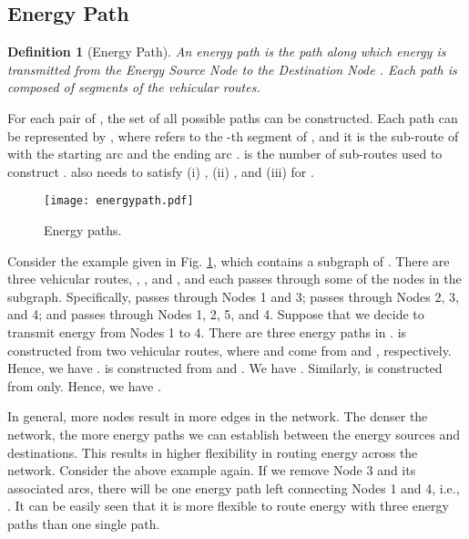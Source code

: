 \documentclass[journal]{IEEEtran}
\newtheorem{definition}{Definition}
\begin{document}
\subsection{Energy Path}
\begin{definition}[Energy Path]
An energy path  is the path along which energy is transmitted from the Energy Source Node  to  the Destination Node . Each path is composed of segments of the vehicular routes.
\end{definition}
For each pair of , the set of all possible paths  can be constructed. Each path  can be represented by , where  refers to the -th segment of , and it is the sub-route of  with the starting arc  and the ending arc .  is the number of sub-routes used to construct .  also needs to satisfy
(i) ,
(ii) , and
(iii)  for .
\begin{figure}[!t]
\centering
\texttt{[image: energypath.pdf]}\vspace{-0.5cm}
\caption{Energy paths.}
\label{fig:energypaths}
\vspace{-0.3cm}
\end{figure}
Consider the example given in Fig. \ref{fig:energypaths}, which contains a subgraph of .  There are three vehicular routes, , , and , and each passes through some of the nodes in the subgraph. Specifically,  passes through Nodes 1 and 3;  passes through Nodes 2, 3, and 4; and  passes through Nodes 1, 2, 5, and 4. Suppose that we decide to transmit energy from Nodes 1 to 4. There are three energy paths in .  is constructed from two vehicular routes, where  and  come from  and , respectively. Hence, we have .
 is constructed from  and . We have .
Similarly,  is constructed from  only. Hence, we have .

In general, more nodes result in more edges in the network. The denser the network, the more energy paths we can establish between the energy sources and destinations. This results in higher flexibility in routing energy across the network. Consider the above example again. If we remove Node 3 and its associated arcs, there will be one energy path left connecting Nodes 1 and 4, i.e., . It can be easily seen that it is more flexible to route energy with three energy paths than one single path.  
\end{document}
